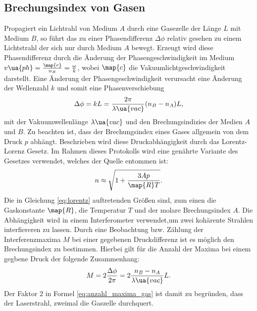 \subsection{Brechungsindex von Gasen}
Propagiert ein Lichtrahl von Medium $A$ durch eine Gasezelle der Länge $L$ mit Medium $B$,
so führt das zu einer Phasendifferenz $\Delta\phi$ relativ gesehen zu einem Lichtstrahl der sich
nur durch Medium $A$ bewegt. Erzeugt wird diese Phasendifferenz durch die Änderung der
Phasengeschwindigkeit im Medium $v\ua{ph}=\frac{\map{c}}{n_B}=\frac{\omega}{k}$, wobei $\map{c}$
die Vakuumlichtgeschwindigkeit darstellt. Eine Änderung der Phasengeschwindigkeit
verursacht eine Änderung der Wellenzahl $k$ und somit eine Phasenverschiebung
\begin{equation}
  \label{eq:phase_shit_gases}
\Delta\phi = kL = \frac{2\pi}{\lambda\ua{vac}}(n_B-n_A)L,
\end{equation}
mit der Vakuumwellenlänge $\lambda\ua{vac}$ und den Brechungsindizies der
Medien $A$ und $B$.
Zu beachten ist, dass der Brechungsindex eines Gases allgemein von dem Druck $p$ abhängt.
Beschrieben wird diese Druckabhängigkeit durch das Lorentz-Lorenz Gesetz.
Im Rahmen dieses Protokolls wird eine genährte Variante des Gesetzes verwendet,
welches der Quelle \cite{lorentz} entommen ist:
\begin{equation}
  \label{eq:lorentz}
  n\approx \sqrt{1+\frac{ 3Ap }{ \map{R}T } }.
\end{equation}
Die in Gleichung \eqref{eq:lorentz} auftretenden Größen sind,
zum einen die Gaskonstante $\map{R}$, die Temperatur $T$ und der
molare Brechungsindex $A$.
Die Abhängigkeit wird in einem Interferometer verwendet,um zwei kohärente Strahlen interfiereren zu lassen.
Durch eine Beobachtung bzw. Zählung der Interferenzmaxima $M$ bei einer gegebenen Druckdifferenz ist es möglich den Brechungsindex zu bestimmen.
Hierbei gilt für die Anzahl der Maxima bei einem gegbene Druck der folgende Zusammenhang:
\begin{equation}
  \label{eq:anzahl_maxima_gas}
  M=2\frac{\Delta\phi}{2\pi}= 2\frac{ n_B-n_A }{ \lambda\ua{vac} }L.
\end{equation}
Der Faktor $2$ in Formel \eqref{eq:anzahl_maxima_gas} ist damit zu begründen, dass der Laserstrahl, zweimal die Gaszelle durchquert.

